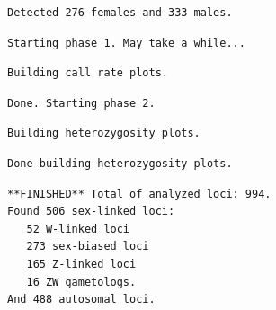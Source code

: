 \documentclass[
  letterpaper,
  DIV=11,
  numbers=noendperiod]{scrreprt}
\let\textttOrig\texttt
\renewcommand{\texttt}[1]{\textttOrig{\color{blue}{#1}}}
\begin{document}
\begin{verbatim}
Detected 276 females and 333 males.
\end{verbatim}

\begin{verbatim}
Starting phase 1. May take a while...
\end{verbatim}

\begin{verbatim}
Building call rate plots.
\end{verbatim}

\begin{figure}[H]

{\centering \texttt{[image: Session10\_SexLinkedMarkers\_files/figure-pdf/unnamed-chunk-3-1.pdf]}

}

\end{figure}

\begin{verbatim}
Done. Starting phase 2.
\end{verbatim}

\begin{verbatim}
Building heterozygosity plots.
\end{verbatim}

\begin{figure}[H]

{\centering \texttt{[image: Session10\_SexLinkedMarkers\_files/figure-pdf/unnamed-chunk-3-2.pdf]}

}

\end{figure}

\begin{figure}[H]

{\centering \texttt{[image: Session10\_SexLinkedMarkers\_files/figure-pdf/unnamed-chunk-3-3.pdf]}

}

\end{figure}

\begin{verbatim}
Done building heterozygosity plots.
\end{verbatim}

\begin{verbatim}
**FINISHED** Total of analyzed loci: 994.
Found 506 sex-linked loci:
   52 W-linked loci
   273 sex-biased loci
   165 Z-linked loci
   16 ZW gametologs.
And 488 autosomal loci.
\end{verbatim}

\begin{figure}[H]

{\centering \texttt{[image: Session10\_SexLinkedMarkers\_files/figure-pdf/unnamed-chunk-3-4.pdf]}

}

\end{figure}
\end{document}
